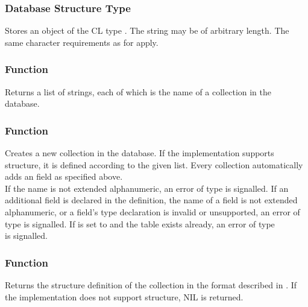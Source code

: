\subsubsection{Database Structure Type }
Stores an object of the CL type . The string may be of arbitrary length. The same character requirements as for  apply.

\subsubsection{Function }
Returns a list of strings, each of which is the name of a collection in the database.

\subsubsection{Function }
Creates a new collection in the database. If the implementation supports structure, it is defined according to the given  list. Every collection automatically adds an  field as specified above. \\

\noindent If the  name is not extended alphanumeric, an error of type  is signalled. If an additional  field is declared in the  definition, the name of a field is not extended alphanumeric, or a field's type declaration is invalid or unsupported, an error of type  is signalled. If  is set to  and the table exists already, an error of type \\ is signalled.

\subsubsection{Function }
Returns the structure definition of the collection in the format described in . If the implementation does not support structure, NIL is returned. \\

